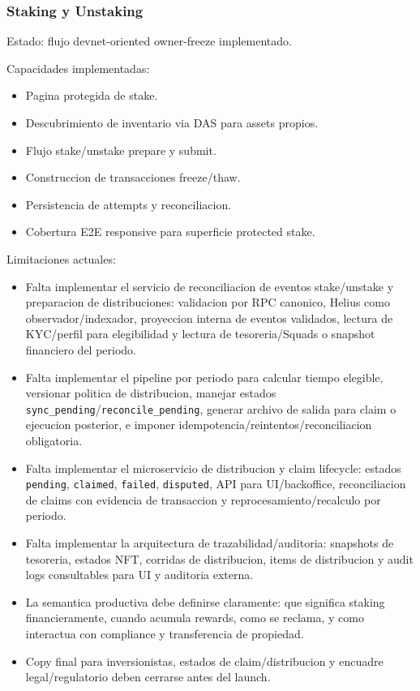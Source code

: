 \documentclass[
  10pt,
  letterpaper,
]{article}
\providecommand{\tightlist}{%
  \setlength{\itemsep}{0pt}\setlength{\parskip}{0pt}}
\let\oldtexttt\texttt
\renewcommand{\texttt}[1]{\oldtexttt{\small #1}}
\begin{document}
\subsubsection{Staking y Unstaking}\label{staking-y-unstaking}

Estado: flujo devnet-oriented owner-freeze implementado.

Capacidades implementadas:

\begin{itemize}
\tightlist
\item
  Pagina protegida de stake.
\item
  Descubrimiento de inventario via DAS para assets propios.
\item
  Flujo stake/unstake prepare y submit.
\item
  Construccion de transacciones freeze/thaw.
\item
  Persistencia de attempts y reconciliacion.
\item
  Cobertura E2E responsive para superficie protected stake.
\end{itemize}

Limitaciones actuales:

\begin{itemize}
\tightlist
\item
  Falta implementar el servicio de reconciliacion de eventos
  stake/unstake y preparacion de distribuciones: validacion por RPC
  canonico, Helius como observador/indexador, proyeccion interna de
  eventos validados, lectura de KYC/perfil para elegibilidad y lectura
  de tesoreria/Squads o snapshot financiero del periodo.
\item
  Falta implementar el pipeline por periodo para calcular tiempo
  elegible, versionar politica de distribucion, manejar estados
  \texttt{sync\_pending}/\texttt{reconcile\_pending}, generar archivo de
  salida para claim o ejecucion posterior, e imponer
  idempotencia/reintentos/reconciliacion obligatoria.
\item
  Falta implementar el microservicio de distribucion y claim lifecycle:
  estados \texttt{pending}, \texttt{claimed}, \texttt{failed},
  \texttt{disputed}, API para UI/backoffice, reconciliacion de claims
  con evidencia de transaccion y reprocesamiento/recalculo por periodo.
\item
  Falta implementar la arquitectura de trazabilidad/auditoria: snapshots
  de tesoreria, estados NFT, corridas de distribucion, items de
  distribucion y audit logs consultables para UI y auditoria externa.
\item
  La semantica productiva debe definirse claramente: que significa
  staking financieramente, cuando acumula rewards, como se reclama, y
  como interactua con compliance y transferencia de propiedad.
\item
  Copy final para inversionistas, estados de claim/distribucion y
  encuadre legal/regulatorio deben cerrarse antes del launch.
\end{itemize}
\end{document}
